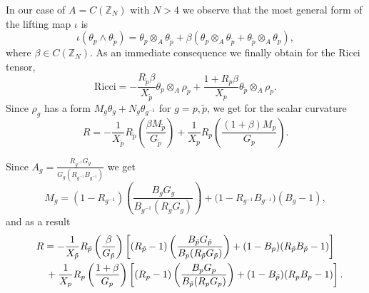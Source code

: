\documentclass[10pt,a4paper]{amsart}
\numberwithin{equation}{section}
\newcommand{\ip}{{\tilde{p}}}
\begin{document}
In our case of $A=C(\mathbb{Z}_N)$ with $N>4$ we observe that the most general form of the lifting map $\iota$ is
\begin{equation*}
\iota(\theta_p\wedge \theta_{\ip})=\theta_p\otimes_A\theta_{\ip}+\beta (\theta_p\otimes_A\theta_{\ip}+\theta_{\ip}\otimes_A\theta_p),
\end{equation*}
where $\beta\in C(\mathbb{Z}_N)$. As an immediate consequence we finally obtain for the Ricci tensor,
\begin{equation*}
\mathrm{Ricci}=-\frac{R_{\ip}\beta}{X_{\ip}}\theta_p\otimes_A\rho_{\ip}+\frac{1+R_p\beta}{X_p}\theta_{\ip}\otimes_A\rho_p.
\end{equation*}
Since $\rho_g$ has a form $M_g\theta_g+N_g\theta_{g^{-1}}$ for $g=p,\ip$, we get for the scalar curvature
\begin{equation*}
R=-\frac{1}{X_{\ip}}R_{\ip}\left(\frac{\beta M_{\ip}}{G_{\ip}}\right)+\frac{1}{X_p}R_p\left(\frac{(1+\beta)M_p}{G_p}\right).
\end{equation*}

Since $A_g=\frac{R_{g^{-1}}G_{g}}{G_g(R_{g^{-1}}B_{g^{-1}})}$ we get
\begin{equation*}
M_g=(1-R_{g^{-1}})\left(\frac{B_gG_g}{B_{g^{-1}}(R_gG_g)}\right)+\big(1-R_{g^{-1}}B_{g^{-1}}\big)(B_g-1),
\end{equation*}
and as a result
\begin{gather*}
R= -\frac{1}{X_{\ip}}R_{\ip}\left(\frac{\beta}{G_{\ip}}\right)\left[(R_{\ip}-1)\left(\frac{B_{\ip}G_{\ip}}{B_p(R_{\ip}G_{\ip})}\right) +(1-B_p)(R_{\ip}B_{\ip}-1)\right] \\
\hphantom{R=}{} + \frac{1}{X_{p}}R_{p}\left(\frac{1+\beta}{G_{p}}\right)\left[(R_{p}-1)\left(\frac{B_{p}G_{p}}{B_{\ip}(R_{p}G_{p})}\right) +(1-B_{\ip})(R_{p}B_{p}-1)\right].
\end{gather*}
\end{document}
